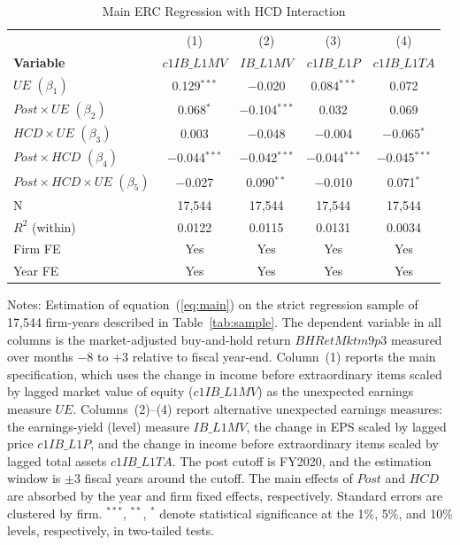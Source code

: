 \documentclass[12pt]{article}
\begin{document}
\clearpage

\begin{table}[ht]
\centering
\caption{Main ERC Regression with HCD Interaction}
\label{tab:main}
\small
\begin{threeparttable}
\begin{tabular}{lcccc}
\toprule
 & (1) & (2) & (3) & (4) \\
\textbf{Variable} & $c1IB\_L1MV$ & $IB\_L1MV$ & $c1IB\_L1P$ & $c1IB\_L1TA$ \\
\midrule
$UE$ \quad $(\beta_1)$                              & 0.129$^{***}$    & $-$0.020         & 0.084$^{***}$    & 0.072            \\
$Post \times UE$ \quad $(\beta_2)$                  & 0.068$^{*}$      & $-$0.104$^{***}$ & 0.032            & 0.069            \\
$HCD \times UE$ \quad $(\beta_3)$                   & 0.003            & $-$0.048         & $-$0.004         & $-$0.065$^{*}$   \\
$Post \times HCD$ \quad $(\beta_4)$                 & $-$0.044$^{***}$ & $-$0.042$^{***}$ & $-$0.044$^{***}$ & $-$0.045$^{***}$ \\
$Post \times HCD \times UE$ \quad $(\beta_5)$       & $-$0.027         & 0.090$^{**}$     & $-$0.010         & 0.071$^{*}$      \\
\midrule
N                                  & 17{,}544 & 17{,}544 & 17{,}544 & 17{,}544 \\
$R^2$ (within)                     & 0.0122   & 0.0115   & 0.0131   & 0.0034   \\
Firm FE                            & Yes & Yes & Yes & Yes \\
Year FE                            & Yes & Yes & Yes & Yes \\
\bottomrule
\end{tabular}
\begin{tablenotes}
\footnotesize
\item Notes: Estimation of equation~(\ref{eq:main}) on the strict regression sample of 17,544 firm-years described in Table~\ref{tab:sample}. The dependent variable in all columns is the market-adjusted buy-and-hold return $BHRetMktm9p3$ measured over months $-8$ to $+3$ relative to fiscal year-end. Column~(1) reports the main specification, which uses the change in income before extraordinary items scaled by lagged market value of equity ($c1IB\_L1MV$) as the unexpected earnings measure $UE$. Columns~(2)--(4) report alternative unexpected earnings measures: the earnings-yield (level) measure $IB\_L1MV$, the change in EPS scaled by lagged price $c1IB\_L1P$, and the change in income before extraordinary items scaled by lagged total assets $c1IB\_L1TA$. The post cutoff is FY2020, and the estimation window is $\pm 3$ fiscal years around the cutoff. The main effects of $Post$ and $HCD$ are absorbed by the year and firm fixed effects, respectively. Standard errors are clustered by firm. $^{***}$, $^{**}$, $^{*}$ denote statistical significance at the 1\%, 5\%, and 10\% levels, respectively, in two-tailed tests.
\end{tablenotes}
\end{threeparttable}
\end{table}
\end{document}
